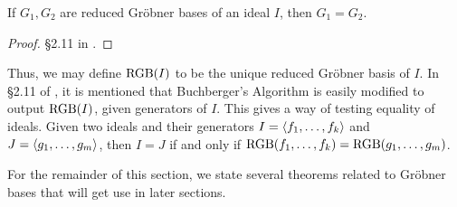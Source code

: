 \begin{theorem}
  If $G_1, G_2$ are reduced Gr\"obner bases of an ideal $I$, then $G_1 = G_2$.
\end{theorem}
\begin{proof}
  \S 2.11 in \cite{buchberger98}.
\end{proof}

Thus, we may define $\operatorname{RGB}(I)$ to be the unique reduced Gr\"obner basis of $I$.
In \S 2.11 of \cite{buchberger98}, it is mentioned that Buchberger's Algorithm is easily modified
to output $\operatorname{RGB}(I)$, given generators of $I$.
This gives a way of testing equality of ideals.
Given two ideals and their generators $I = \left\langle f_1, \ldots, f_k \right\rangle$ and $J = \left\langle g_1, \ldots, g_m \right\rangle$,
then $I = J$ if and only if $\operatorname{RGB}(f_1, \ldots, f_k) = \operatorname{RGB}(g_1, \ldots, g_m)$.

For the remainder of this section, we state several theorems related to Gr\"obner bases
that will get use in later sections.

